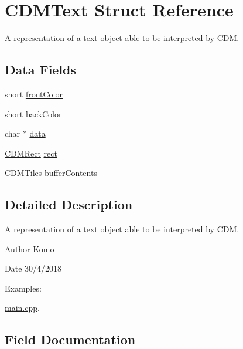 \hypertarget{struct_c_d_m_text}{}\section{C\+D\+M\+Text Struct Reference}
\label{struct_c_d_m_text}


A representation of a text object able to be interpreted by C\+DM.  


\subsection*{Data Fields}
\begin{DoxyCompactItemize}
\item 
short \mbox{\hyperlink{struct_c_d_m_text_aaacd880862e20179647e2a4423a6fdd0}{front\+Color}}
\item 
short \mbox{\hyperlink{struct_c_d_m_text_a775cc897fb48457073cae34a85b735fe}{back\+Color}}
\item 
char $\ast$ \mbox{\hyperlink{struct_c_d_m_text_a91a70b77df95bd8b0830b49a094c2acb}{data}}
\item 
\mbox{\hyperlink{_c_d_m_8h_a23402dc2128c3c7f1e88e505a5631b9c}{C\+D\+M\+Rect}} \mbox{\hyperlink{struct_c_d_m_text_aa61e26c3b59930152cdaa0ce2dac8b14}{rect}}
\item 
\mbox{\hyperlink{struct_c_d_m_tiles}{C\+D\+M\+Tiles}} \mbox{\hyperlink{struct_c_d_m_text_a095e3adb5378aedc48f9a15d9f2e84b9}{buffer\+Contents}}
\end{DoxyCompactItemize}


\subsection{Detailed Description}
A representation of a text object able to be interpreted by C\+DM. 

\begin{DoxyAuthor}{Author}
Komo 
\end{DoxyAuthor}
\begin{DoxyDate}{Date}
30/4/2018 
\end{DoxyDate}
\begin{Desc}
\item[Examples\+: ]\par
\mbox{\hyperlink{main_8cpp-example}{main.\+cpp}}.\end{Desc}


\subsection{Field Documentation}
\mbox{\label{struct_c_d_m_text_a775cc897fb48457073cae34a85b735fe}} 
